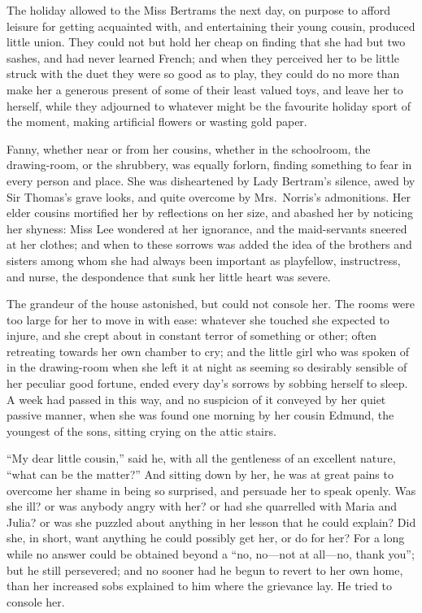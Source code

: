 \documentclass{article}
\begin{document}
The holiday allowed to the Miss Bertrams the next day,
on purpose to afford leisure for getting acquainted with,
and entertaining their young cousin, produced little union.
They could not but hold her cheap on finding that she
had but two sashes, and had never learned French; and when
they perceived her to be little struck with the duet they
were so good as to play, they could do no more than make
her a generous present of some of their least valued toys,
and leave her to herself, while they adjourned to whatever
might be the favourite holiday sport of the moment,
making artificial flowers or wasting gold paper.

Fanny, whether near or from her cousins, whether in
the schoolroom, the drawing-room, or the shrubbery,
was equally forlorn, finding something to fear in
every person and place.  She was disheartened by Lady
Bertram's silence, awed by Sir Thomas's grave looks,
and quite overcome by Mrs.\ Norris's admonitions.
Her elder cousins mortified her by reflections on her size,
and abashed her by noticing her shyness:  Miss Lee
wondered at her ignorance, and the maid-servants sneered
at her clothes; and when to these sorrows was added the idea
of the brothers and sisters among whom she had always
been important as playfellow, instructress, and nurse,
the despondence that sunk her little heart was severe.

The grandeur of the house astonished, but could not console her.
The rooms were too large for her to move in with ease:
whatever she touched she expected to injure, and she
crept about in constant terror of something or other;
often retreating towards her own chamber to cry;
and the little girl who was spoken of in the drawing-room
when she left it at night as seeming so desirably sensible
of her peculiar good fortune, ended every day's sorrows
by sobbing herself to sleep.  A week had passed in this way,
and no suspicion of it conveyed by her quiet passive manner,
when she was found one morning by her cousin Edmund,
the youngest of the sons, sitting crying on the attic stairs.

``My dear little cousin,'' said he, with all the gentleness
of an excellent nature, ``what can be the matter?''  And sitting
down by her, he was at great pains to overcome her shame
in being so surprised, and persuade her to speak openly.
Was she ill? or was anybody angry with her? or had she
quarrelled with Maria and Julia? or was she puzzled
about anything in her lesson that he could explain?
Did she, in short, want anything he could possibly get her,
or do for her?  For a long while no answer could be
obtained beyond a ``no, no---not at all---no, thank you'';
but he still persevered; and no sooner had he begun to
revert to her own home, than her increased sobs explained
to him where the grievance lay.  He tried to console her.
\end{document}
